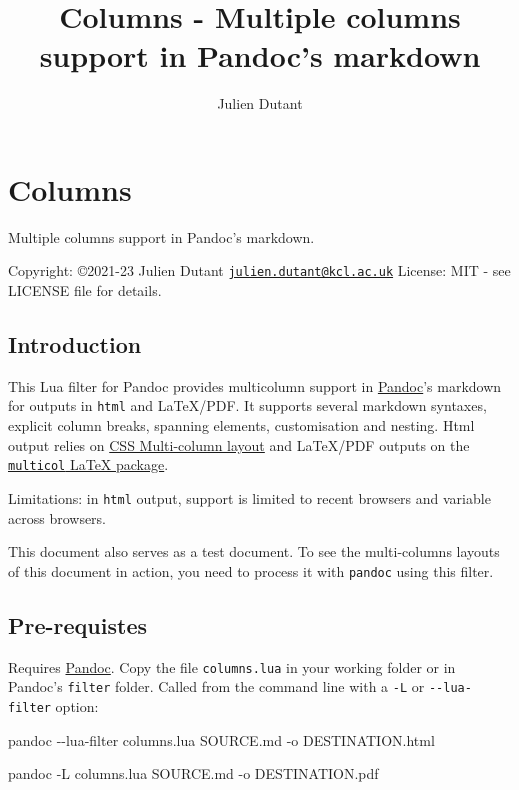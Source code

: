\documentclass[
]{article}
\title{Columns - Multiple columns support in Pandoc's markdown}
\author{Julien Dutant}
\date{}
\newenvironment{Shaded}{}{}
\newcommand{\AttributeTok}[1]{\textcolor[rgb]{0.49,0.56,0.16}{#1}}
\newcommand{\ExtensionTok}[1]{#1}
\newcommand{\NormalTok}[1]{#1}
\begin{document}
\maketitle

\hypertarget{columns}{%
\section{Columns}\label{columns}}

Multiple columns support in Pandoc's markdown.

Copyright: ©2021-23 Julien Dutant
\href{mailto:julien.dutant@kcl.ac.uk}{\nolinkurl{julien.dutant@kcl.ac.uk}}
License: MIT - see LICENSE file for details.

\hypertarget{introduction}{%
\subsection{Introduction}\label{introduction}}

This Lua filter for Pandoc provides multicolumn support in
\href{https://pandoc.org/}{Pandoc}'s markdown for outputs in
\texttt{html} and LaTeX/PDF. It supports several markdown syntaxes,
explicit column breaks, spanning elements, customisation and nesting.
Html output relies on \href{https://drafts.csswg.org/css-multicol}{CSS
Multi-column layout} and LaTeX/PDF outputs on the
\href{https://www.ctan.org/pkg/multicol}{\texttt{multicol} LaTeX
package}.

Limitations: in \texttt{html} output, support is limited to recent
browsers and variable across browsers.

This document also serves as a test document. To see the multi-columns
layouts of this document in action, you need to process it with
\texttt{pandoc} using this filter.

\hypertarget{pre-requistes}{%
\subsection{Pre-requistes}\label{pre-requistes}}

Requires \href{https://pandoc.org/}{Pandoc}. Copy the file
\texttt{columns.lua} in your working folder or in Pandoc's
\texttt{filter} folder. Called from the command line with a \texttt{-L}
or \texttt{-\/-lua-filter} option:

\begin{Shaded}
\begin{Highlighting}[]
\ExtensionTok{pandoc} \AttributeTok{{-}{-}lua{-}filter}\NormalTok{ columns.lua SOURCE.md }\AttributeTok{{-}o}\NormalTok{ DESTINATION.html}

\ExtensionTok{pandoc} \AttributeTok{{-}L}\NormalTok{ columns.lua SOURCE.md }\AttributeTok{{-}o}\NormalTok{ DESTINATION.pdf}
\end{Highlighting}
\end{Shaded}
\end{document}

